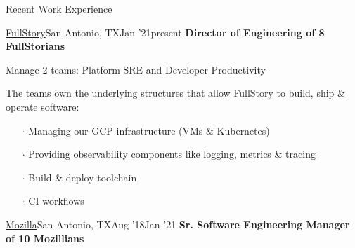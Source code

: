\documentclass{resume} %
\begin{document}
\begin{rSection}{Recent Work Experience}


\begin{rSubsection}{\href{https://www.fullstory.com/}{FullStory}}{San Antonio, TX}{Jan '21}{present}
  {\textbf{Director of Engineering of 8 FullStorians}}

\item Manage 2 teams: Platform SRE and Developer Productivity
\item The teams own the underlying structures that allow FullStory to build, ship \& operate software:

 \vspace{-0.5em}
    \begin{itemize} \itemsep0.5pt \parskip0pt
    \item[$\cdot$] Managing our GCP infrastructure (VMs \& Kubernetes)
    \item[$\cdot$] Providing observability components like logging, metrics \& tracing
    \item[$\cdot$] Build \& deploy toolchain
    \item[$\cdot$] CI workflows
    \end{itemize}
    
    
\end{rSubsection}


\begin{rSubsection}{\href{https://www.mozilla.org/}{Mozilla}}{San Antonio, TX}{Aug '18}{Jan '21}
  {\textbf{Sr. Software Engineering Manager of 10 Mozillians}}



\end{rSubsection}
\end{rSection}
\end{document}

